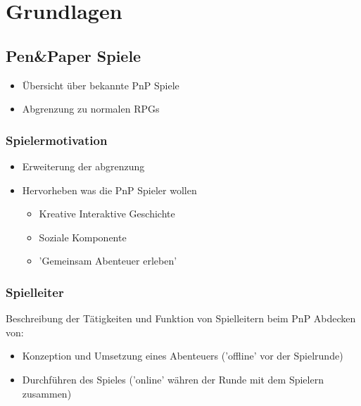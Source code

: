 \chapter{Grundlagen}
\label{background}




\section{Pen\&Paper Spiele}
\label{sec:PenPaperSpiele}

\begin{itemize}
	\item Übersicht über bekannte PnP Spiele
	\item Abgrenzung zu normalen RPGs
\end{itemize}


\subsection{Spielermotivation}
\label{sec:Spielermotivation}

\begin{itemize}
	\item Erweiterung der abgrenzung
	\item Hervorheben was die PnP Spieler wollen
	
	\begin{itemize}
		\item Kreative Interaktive Geschichte
		\item Soziale Komponente
		\item 'Gemeinsam Abenteuer erleben'
	\end{itemize}
	
\end{itemize}

\subsection{Spielleiter}
\label{sec:Spielleiter}
Beschreibung der Tätigkeiten und Funktion von Spielleitern beim PnP\newline
Abdecken von:
\begin{itemize}
	\item Konzeption und Umsetzung eines Abenteuers ('offline' vor der Spielrunde)
	\item Durchführen des Spieles ('online' währen der Runde mit dem Spielern zusammen)
\end{itemize}


